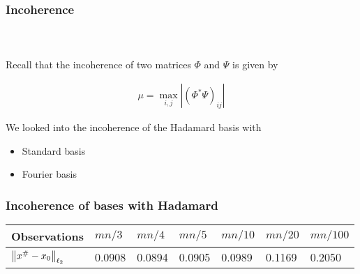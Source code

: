 
\begin{frame}[t]
\frametitle{Incoherence}
\framesubtitle{~~}  %

Recall that the incoherence of two matrices $\Phi$ and $\Psi$ is given by 

\begin{align}
	\mu = \max_{i,j} |(\Phi^* \Psi)_{ij}|
	\label{incoherence}
\end{align}

We looked into the incoherence of the Hadamard basis with
\begin{itemize}
	\item Standard basis 
	\item Fourier basis
\end{itemize}
\end{frame}


\begin{frame}[t]
	\frametitle{Incoherence of bases with Hadamard}


\begin{table}[h]
\begin{tabular}{l|l|l|l|l|l|l}
Observations                 & $mn/3$ & $mn/4$ & $mn/5$ & $mn/10$ & $mn/20$ & $mn/100$ \\ \hline
$\left\lVert x^\# - x_0 \right\rVert_{\ell_2}$ & 0.0908 & 0.0894 & 0.0905 & 0.0989  & 0.1169  & 0.2050   \\
\end{tabular}
\end{table}

\end{frame}




